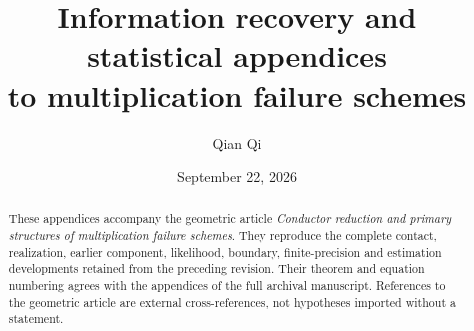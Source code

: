 \documentclass[11pt,reqno]{amsart}
\title[Information recovery and statistical appendices]{Information recovery and statistical appendices\\to multiplication failure schemes}
\author{Qian Qi}
\date{September 22, 2026}
\numberwithin{equation}{section}
\theoremstyle{definition}\newtheorem{definition}[theorem]{Definition}
\theoremstyle{remark}\newtheorem{remark}[theorem]{Remark}
\begin{document}
\begin{abstract}
These appendices accompany the geometric article \emph{Conductor reduction
and primary structures of multiplication failure schemes}. They reproduce the
complete contact, realization, earlier component, likelihood, boundary,
finite-precision and estimation developments retained from the preceding
revision. Their theorem and equation numbering agrees with the appendices
of the full archival manuscript. References to the geometric article are
external cross-references, not hypotheses imported without a statement.
\end{abstract}
\maketitle
\appendix









\end{document}
